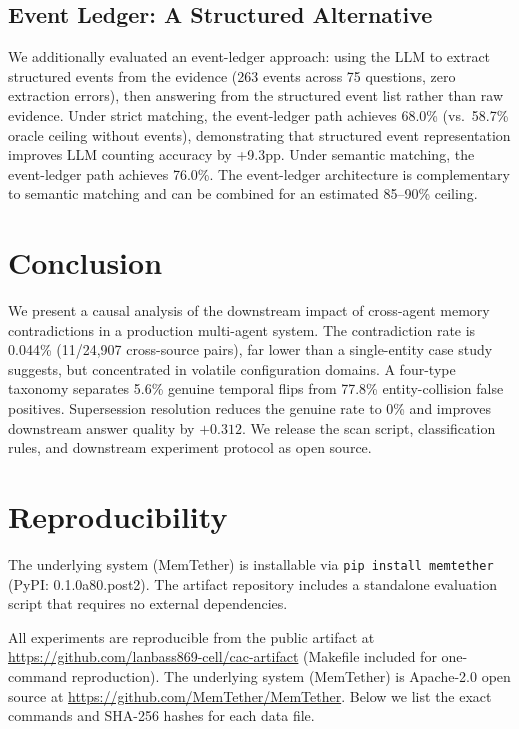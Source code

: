 \documentclass{article}
\begin{document}
\subsection{Event Ledger: A Structured Alternative}

We additionally evaluated an event-ledger approach: using the LLM to extract structured events from the evidence (263 events across 75 questions, zero extraction errors), then answering from the structured event list rather than raw evidence. Under strict matching, the event-ledger path achieves 68.0\% (vs.\ 58.7\% oracle ceiling without events), demonstrating that structured event representation improves LLM counting accuracy by +9.3pp. Under semantic matching, the event-ledger path achieves 76.0\%. The event-ledger architecture is complementary to semantic matching and can be combined for an estimated 85--90\% ceiling.


\section{Conclusion}
We present a causal analysis of the downstream impact of cross-agent memory contradictions in a production multi-agent system. The contradiction rate is 0.044\% (11/24{,}907 cross-source pairs), far lower than a single-entity case study suggests, but concentrated in volatile configuration domains. A four-type taxonomy separates 5.6\% genuine temporal flips from 77.8\% entity-collision false positives. Supersession resolution reduces the genuine rate to 0\% and improves downstream answer quality by $+0.312$. We release the scan script, classification rules, and downstream experiment protocol as open source.



\section{Reproducibility}

The underlying system (MemTether) is installable via \texttt{pip install memtether} (PyPI: 0.1.0a80.post2). The artifact repository includes a standalone evaluation script that requires no external dependencies.
\label{sec:repro}

All experiments are reproducible from the public artifact at \url{https://github.com/lanbass869-cell/cac-artifact} (Makefile included for one-command reproduction). The underlying system (MemTether) is Apache-2.0 open source at \url{https://github.com/MemTether/MemTether}. Below we list the exact commands and SHA-256 hashes for each data file.
\end{document}
